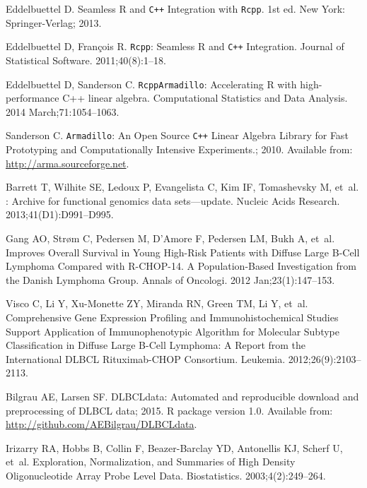 \documentclass[10pt,letterpaper]{article}
\newcommand{\R}{\textsf{R}}
\begin{document}
\begin{thebibliography}{10}
Eddelbuettel D.
\newblock Seamless {\R} and \texttt{C++} Integration with \texttt{Rcpp}.
\newblock 1st ed. New York: {Springer-Verlag}; 2013.

Eddelbuettel D, Fran\c{c}ois R.
\newblock \texttt{Rcpp}: Seamless {\R} and \texttt{C++} Integration.
\newblock Journal of Statistical Software. 2011;40(8):1--18.

Eddelbuettel D, Sanderson C.
\newblock \texttt{RcppArmadillo}: Accelerating \textsf{R} with high-performance
  \textsf{{C}++} linear algebra.
\newblock Computational Statistics and Data Analysis. 2014 March;71:1054--1063.

Sanderson C. \texttt{Armadillo}: An Open Source \texttt{C++} Linear Algebra
  Library for Fast Prototyping and Computationally Intensive Experiments.;
  2010.
\newblock Available from: \url{http://arma.sourceforge.net}.

Barrett T, Wilhite SE, Ledoux P, Evangelista C, Kim IF, Tomashevsky M, et~al.
: {A}rchive for functional genomics data sets—update.
\newblock Nucleic Acids Research. 2013;41(D1):D991--D995.

Gang AO, Str{\o}m C, Pedersen M, D'Amore F, Pedersen LM, Bukh A, et~al.
 Improves Overall Survival in Young High-Risk Patients
  with Diffuse Large {B}-Cell Lymphoma Compared with {R-CHOP-14}. A
  Population-Based Investigation from the Danish Lymphoma Group.
\newblock Annals of Oncologi. 2012 Jan;23(1):147--153.

Visco C, Li Y, Xu-Monette ZY, Miranda RN, Green TM, Li Y, et~al.
\newblock Comprehensive Gene Expression Profiling and Immunohistochemical
  Studies Support Application of Immunophenotypic Algorithm for Molecular
  Subtype Classification in Diffuse Large {B}-Cell Lymphoma: A Report from the
  International {DLBCL} Rituximab-{CHOP} Consortium.
\newblock Leukemia. 2012;26(9):2103--2113.

Bilgrau AE, Larsen SF. DLBCLdata: Automated and reproducible download and
  preprocessing of DLBCL data; 2015.
\newblock R package version 1.0.
\newblock Available from: \url{http://github.com/AEBilgrau/DLBCLdata}.

Irizarry RA, Hobbs B, Collin F, Beazer-Barclay YD, Antonellis KJ, Scherf U,
  et~al.
\newblock Exploration, Normalization, and Summaries of High Density
  Oligonucleotide Array Probe Level Data.
\newblock Biostatistics. 2003;4(2):249--264.


\end{thebibliography}
\end{document}
